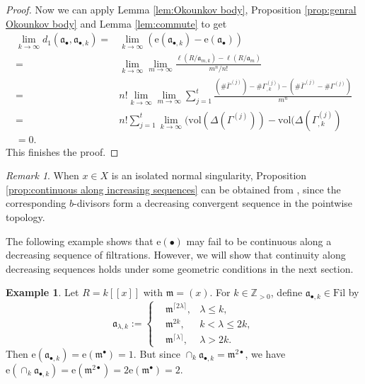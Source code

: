 \documentclass[11pt, leqno]{amsart}%
\theoremstyle{plain}
\theoremstyle{definition}
\newtheorem{example}[theorem]{Example}
\theoremstyle{remark}
\newtheorem{remark}[theorem]{Remark}
\newcommand{\bZ}{\mathbb{Z}}
\newcommand{\fa}{\mathfrak{a}}
\newcommand{\fm}{\mathfrak{m}}
\newcommand{\vol}{\mathrm{vol}}
\newcommand{\e}{\mathrm{e}}
\newcommand{\Fil}{\mathrm{Fil}}
\numberwithin{equation}{section}
\begin{document}
\begin{proof}
    Now we can apply Lemma \ref{lem:Okounkov body}, Proposition \ref{prop:genral Okounkov body} and Lemma \ref{lem:commute} to get
    \begin{align*}
        \lim_{k\to\infty} d_1(\fa_\bullet,\fa_{\bullet,k})=&\lim_{k\to\infty} (\e(\fa_{\bullet,k})-\e(\fa_\bullet))\\
        =&\lim_{k\to\infty}\lim_{m\to\infty}\frac{\ell(R/\fa_{m,k})-\ell(R/\fa_m)}{m^n/n!}\\
        =&n!\lim_{k\to\infty}\lim_{m\to\infty} \sum_{j=1}^t\frac{(\#\bar\Gamma^{(j)})-\#\Gamma_{,k}^{(j)})-(\#\bar\Gamma^{(j)}-\#\Gamma^{(j)})}{m^n}\\
        =&n!\sum_{j=1}^t\lim_{k\to\infty}(\vol(\Delta(\Gamma^{(j)}))-\vol(\Delta(\Gamma_{,k}^{(j)})\\
        =0.
    \end{align*}
    This finishes the proof.
\end{proof}

\begin{remark}
    When $x\in X$ is an isolated normal singularity, Proposition \ref{prop:continuous along increasing sequences} can be obtained from \cite[Theorem 4.14]{BdFF12}, since the corresponding $b$-divisors form a decreasing convergent sequence in the pointwise topology.
\end{remark}



The following example shows that $\e(\bullet)$ may fail to be continuous along a decreasing sequence of filtrations. However, we will show that continuity along decreasing sequences holds under some geometric conditions in the next section.

\begin{example}\label{eg:jumping up along decreasing sequences}
    Let $R=k[\![x]\!]$ with $\fm=(x)$. For $k\in\bZ_{>0}$, define $\fa_{\bullet,k}\in\Fil$ by
    \begin{equation*}
        \fa_{\lambda,k}:=
        \left\{\begin{aligned}
        &\fm^{\lceil 2\lambda \rceil}, &\lambda\le k,\\
        &\fm^{2k}, &k<\lambda\le 2k,\\
        &\fm^{\lceil \lambda \rceil}, &\lambda> 2k.
        \end{aligned}\right.
    \end{equation*}
    Then $\e(\fa_{\bullet,k})=\e(\fm^\bullet)=1$. But since $\cap_k \fa_{\bullet,k}=\fm^{2\bullet}$, we have $\e(\cap_k \fa_{\bullet,k})=\e(\fm^{2\bullet})=2\e(\fm^\bullet)=2$.  
\end{example}
\end{document}
